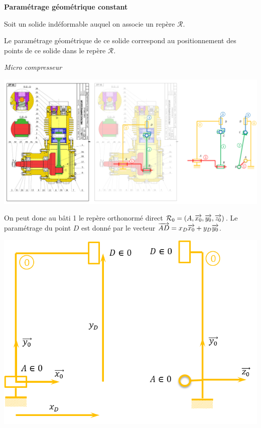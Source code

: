 \documentclass[10pt,oneside]{article}
\begin{document}
\begin{defi}
\textbf{Paramétrage géométrique constant}

Soit un solide indéformable auquel on associe un repère $\mathcal{R}$.

Le paramétrage géométrique de ce solide correspond au positionnement des points de ce solide dans le repère $\mathcal{R}$. 
\end{defi}

\begin{exemple}
\textit{Micro compresseur}
\begin{center}
\includegraphics[width=.95\textwidth]{png/modelisme}
\end{center}
\begin{minipage}[c]{.4\linewidth}
On peut donc au bâti 1 le repère orthonormé direct $\mathcal{R}_0=\left(A,\overrightarrow{x_0},\overrightarrow{y_0},\overrightarrow{z_0}\right)$. Le paramétrage du point $D$ est donné par le vecteur $\overrightarrow{AD}=x_D\overrightarrow{x_0} + y_D\overrightarrow{y_0}$.
\end{minipage} \hfill
\begin{minipage}[c]{.55\linewidth}
\begin{center}
\includegraphics[width=.95\textwidth]{png/solide_0}
\end{center}
\end{minipage}
\end{exemple}
\end{document}
